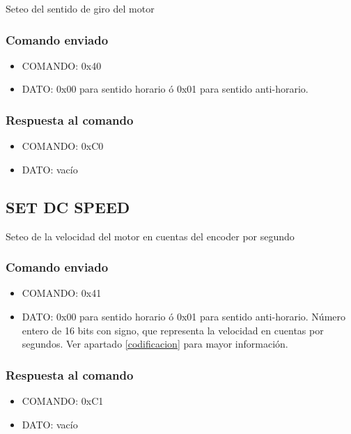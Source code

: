 \documentclass[a4paper,10pt]{article}
\begin{document}
Seteo del sentido de giro del motor

\subsubsection*{Comando enviado}

\begin{itemize}
	\item{COMANDO:} 0x40
	\item{DATO:} 0x00 para sentido horario \'o 0x01 para sentido anti-horario.
\end{itemize}

\subsubsection*{Respuesta al comando}

\begin{itemize}
	\item{COMANDO:} 0xC0
	\item{DATO:} vac\'io
\end{itemize}

\subsection{SET DC SPEED}
\label{set_dc_speed}

Seteo de la velocidad del motor en cuentas del encoder por segundo

\subsubsection*{Comando enviado}

\begin{itemize}
	\item{COMANDO:} 0x41
	\item{DATO:} 0x00 para sentido horario \'o 0x01 para sentido anti-horario.
		N\'umero entero de 16 bits con signo, que representa la velocidad en cuentas por segundos.
		Ver apartado \ref{codificacion} para mayor informaci\'on.
\end{itemize}

\subsubsection*{Respuesta al comando}

\begin{itemize}
	\item{COMANDO:} 0xC1
	\item{DATO:} vac\'io
\end{itemize}
\end{document}
